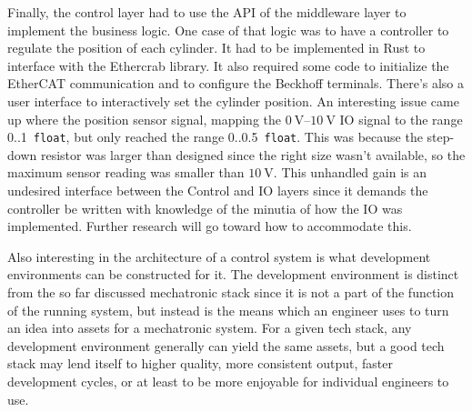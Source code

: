 \documentclass[english,12pt,a4paper,pdftex,eng,utf8]{aaltothesis}
\begin{document}
Finally, the control layer had to use the API of the middleware layer to implement the business logic. One case of that logic was to have a controller to regulate the position of each cylinder. It had to be implemented in Rust to interface with the Ethercrab library. It also required some code to initialize the EtherCAT communication and to configure the Beckhoff terminals. There's also a user interface to interactively set the cylinder position. An interesting issue came up where the position sensor signal, mapping the $\qtyrange[range-units=single,range-phrase=..]{0}{10}{\volt}$ IO signal to the range 0..1~\verb|float|, but only reached the range 0..0.5~\verb|float|. This was because the step-down resistor was larger than designed since the right size wasn't available, so the maximum sensor reading was smaller than $\qty{10}{\volt}$. This unhandled gain is an undesired interface between the Control and IO layers since it demands the controller be written with knowledge of the minutia of how the IO was implemented. Further research will go toward how to accommodate this.

Also interesting in the architecture of a control system is what development environments can be constructed for it.  The development environment is distinct from the so far discussed mechatronic stack since it is not a part of the function of the running system, but instead is the means which an engineer uses to turn an idea into assets for a mechatronic system.  For a given tech stack, any development environment generally can yield the same assets, but a good tech stack may lend itself to higher quality, more consistent output, faster development cycles, or at least to be more enjoyable for individual engineers to use.
\end{document}
